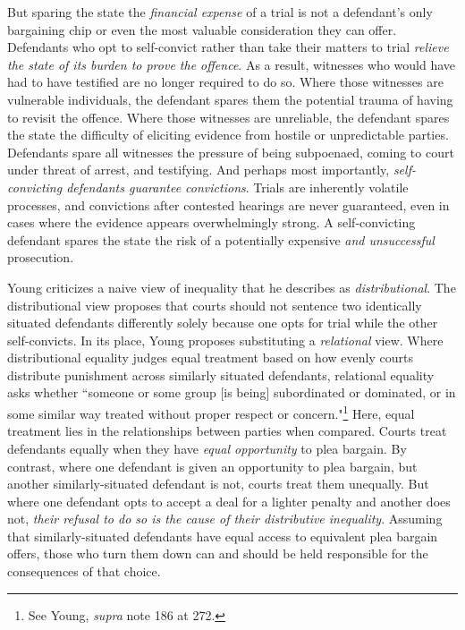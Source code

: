 But sparing the state the \textit{financial expense} of a trial is not a defendant's only bargaining chip or even the most valuable consideration they can offer. Defendants who opt to self-convict rather than take their matters to trial \textit{relieve the state of its burden to prove the offence}. As a result, witnesses who would have had to have testified are no longer required to do so. Where those witnesses are vulnerable individuals, the defendant spares them the potential trauma of having to revisit the offence. Where those witnesses are unreliable, the defendant spares the state the difficulty of eliciting evidence from hostile or unpredictable parties. Defendants spare all witnesses the pressure of being subpoenaed, coming to court under threat of arrest, and testifying. And perhaps most importantly, \textit{self-convicting defendants guarantee convictions}. Trials are inherently volatile processes, and convictions after contested hearings are never guaranteed, even in cases where the evidence appears overwhelmingly strong. A self-convicting defendant spares the state the risk of a potentially expensive \textit{and unsuccessful} prosecution.

Young criticizes a naive view of inequality that he describes as \textit{distributional}. The distributional view proposes that courts should not sentence two identically situated defendants differently solely because one opts for trial while the other self-convicts. In its place, Young proposes substituting a \textit{relational} view. Where distributional equality judges equal treatment based on how evenly courts distribute punishment across similarly situated defendants, relational equality asks whether ``someone or some group [is being] subordinated or dominated, or in some similar way treated without proper respect or concern."\footnote{See Young, \textit{supra} note 186 at 272.} Here, equal treatment lies in the relationships between parties when compared. Courts treat defendants equally when they have \textit{equal opportunity} to plea bargain. By contrast, where one defendant is given an opportunity to plea bargain, but another similarly-situated defendant is not, courts treat them unequally. But where one defendant opts to accept a deal for a lighter penalty and another does not, \textit{their refusal to do so is the cause of their distributive inequality}. Assuming that similarly-situated defendants have equal access to equivalent plea bargain offers, those who turn them down can and should be held responsible for the consequences of that choice.

